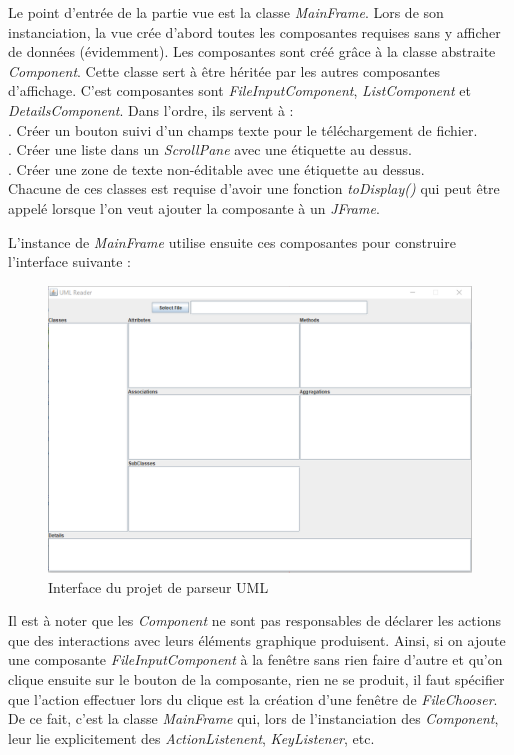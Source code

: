\documentclass[12pt]{article} %
\begin{document}
Le point d'entrée de la partie vue est la classe \textit{MainFrame}.  Lors de son instanciation, la vue crée d'abord toutes les composantes requises sans y afficher de données (évidemment).  Les composantes sont créé grâce à la classe abstraite \textit{Component}.  Cette classe sert à être héritée par les autres composantes d'affichage.  C'est composantes sont \textit{FileInputComponent}, \textit{ListComponent} et \textit{DetailsComponent}.  Dans l'ordre, ils servent à :\\
. Créer un bouton suivi d'un champs texte pour le téléchargement de fichier.\\
. Créer une liste dans un \textit{ScrollPane} avec une étiquette au dessus.\\
. Créer une zone de texte non-éditable avec une étiquette au dessus.\\
Chacune de ces classes est requise d'avoir une fonction \textit{toDisplay()} qui peut être appelé lorsque l'on veut ajouter la composante à un \textit{JFrame}.

L'instance de \textit{MainFrame} utilise ensuite ces composantes pour construire l'interface suivante :

\begin{figure}[h]
  \includegraphics[width=\linewidth]{img/interface.PNG}
  \caption{Interface du projet de parseur UML}
  \label{fig:interface}
\end{figure}

Il est à noter que les \textit{Component} ne sont pas responsables de déclarer les actions que des interactions avec leurs éléments graphique produisent.  Ainsi, si on ajoute une composante \textit{FileInputComponent} à la fenêtre sans rien faire d'autre et qu'on clique ensuite sur le bouton de la composante, rien ne se produit, il faut spécifier que l'action effectuer lors du clique est la création d'une fenêtre de \textit{FileChooser}.  De ce fait, c'est la classe \textit{MainFrame} qui, lors de l'instanciation des \textit{Component}, leur lie explicitement des \textit{ActionListenent}, \textit{KeyListener}, etc.
\end{document}
